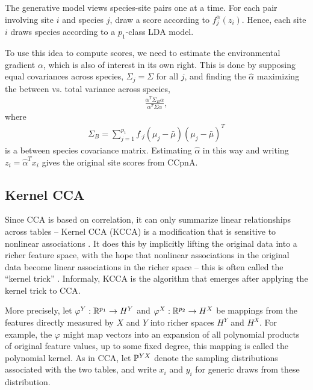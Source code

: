 \documentclass[14pt]{extarticle}
\begin{document}
The generative model views species-site pairs one at a time. For each pair
involving site $i$ and species $j$, draw a score according to
$f_{j}^{\alpha}\left(z_{i}\right)$. Hence, each site $i$ draws species according
to a $p_{1}$-class LDA model.

To use this idea to compute scores, we need to estimate the environmental
gradient $\alpha$, which is also of interest in its own right. This is done by
supposing equal covariances across species, $\Sigma_{j} = \Sigma$ for all $j$,
and finding the $\hat{\alpha}$ maximizing the between vs. total variance across
species,
\begin{align*}
  \frac{\alpha^{T} \Sigma_{B} \alpha}{\alpha^{T} \Sigma \alpha},
\end{align*}
where
\begin{align*}
  \Sigma_{B} = \sum_{j = 1}^{p_{1}} f_{\cdot j}\left(\mu_{j} -
  \bar{\mu}\right)\left(\mu_{j} - \bar{\mu}\right)^{T}
\end{align*}
is a between species covariance matrix. Estimating $\hat{\alpha}$ in this way
and writing $z_{i} = \hat{\alpha}^{T}x_{i}$ gives the original site scores from
CCpnA.

\subsection{Kernel CCA}
\label{subsec:kernel_cca}

Since CCA is based on correlation, it can only summarize linear relationships
across tables -- Kernel CCA (KCCA) is a modification that is sensitive to
nonlinear associations \citep{akaho2006kernel, bach2003kernel,
  lanckriet2004statistical}. It does this by implicitly lifting the original
data into a richer feature space, with the hope that nonlinear associations in
the original data become linear associations in the richer space -- this is
often called the ``kernel trick'' \citep{scholkopf2001kernel}. Informaly, KCCA
is the algorithm that emerges after applying the kernel trick to CCA.

More precisely, let $\varphi^{Y}: \reals^{p_{1}} \to H^{Y}$ and $\varphi^{X}:
\reals^{p_{2}} \to H^{X}$ be mappings from the features directly measured by $X$
and $Y$ into richer spaces $H^{Y}$ and $H^{X}$. For example, the $\varphi$ might
map vectors into an expansion of all polynomial products of original feature
values, up to some fixed degree, this mapping is called the polynomial kernel.
As in CCA, let $\P^{YX}$ denote the sampling distributions associated with the
two tables, and write $x_{i}$ and $y_{i}$ for generic draws from these
distribution.
\end{document}
